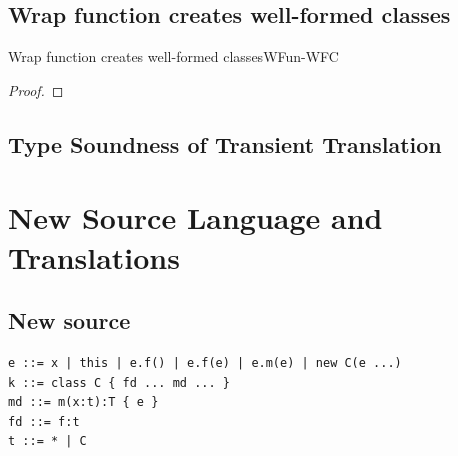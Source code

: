 \documentclass[acmlarge, anonymous, authordraft]{acmart}
\begin{document}
\subsection{Wrap function creates well-formed classes}

  \begin{theorem}{Wrap function creates well-formed classes}{WFun-WFC}
  
  \begin{conds}
   \cond{\WFq{\K~\e~\s}}
   \cond{\names{\classoff\Cp\K} $\subseteq$ \names{\classoff\C\K}}
   \cond{\fresh\D}
  \end{conds}
  
  \then\axiom{\WF{}\s\K{\k}}
  
    \begin{proof} \innat
    
    \end{proof}
   \end{theorem}


\subsection{Type Soundness of Transient Translation}

\section{New Source Language and Translations}

\subsection{New source}

\begin{verbatim}
e ::= x | this | e.f() | e.f(e) | e.m(e) | new C(e ...) 
k ::= class C { fd ... md ... }
md ::= m(x:t):T { e }
fd ::= f:t
t ::= * | C
\end{verbatim}
\end{document}
